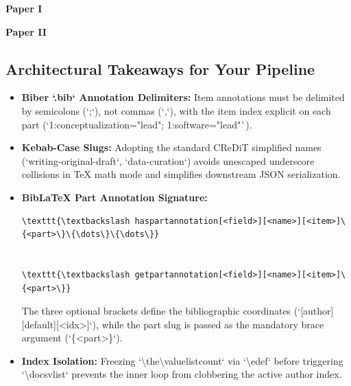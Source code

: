 \documentclass[12pt, twoside]{article}
\begin{document}
\DeclareNameFormat{creditnames}{%
  \edef\currentauthornum{\the\value{listcount}}%
  \par\smallskip\noindent\textbf{\namepartgiven} \textbf{\namepartfamily}%
  \def\do##1{\checkandprintrole{\currentauthornum}{##1}}%
  \expandafter\docsvlist\expandafter{\CreditSlugList}%
}



\textbf{Paper I}\\

\textbf{Paper II}\\
\endgroup



\subsection{Architectural Takeaways for Your Pipeline}
\begin{itemize}
    \item \textbf{Biber `.bib` Annotation Delimiters:} Item annotations must be delimited by semicolons (`;`), not commas (`,`), with the item index explicit on each part (\eg `1:conceptualization="lead"; 1:software="lead"`).
    \item \textbf{Kebab-Case Slugs:} Adopting the standard \gls{CReDiT} simplified names (\eg `writing-original-draft`, `data-curation`) avoids unescaped underscore collisions in TeX math mode and simplifies downstream \gls{JSON} serialization.
    \item \textbf{BibLaTeX Part Annotation Signature:}
\begin{verbatim}
\texttt{\textbackslash haspartannotation[<field>][<name>][<item>]\{<part>\}\{\dots\}\{\dots\}}


\texttt{\textbackslash getpartannotation[<field>][<name>][<item>]\{<part>\}}
\end{verbatim}


The three optional brackets define the bibliographic coordinates (`[author][default][<idx>]`), while the part slug is passed as the mandatory brace argument (`\{<part>\}`).
    \item \textbf{Index Isolation:} Freezing `\textbackslash the\textbackslash value{listcount}` via `\textbackslash edef` before triggering `\textbackslash docsvlist` prevents the inner loop from clobbering the active author index.
\end{itemize} 
\end{document}

